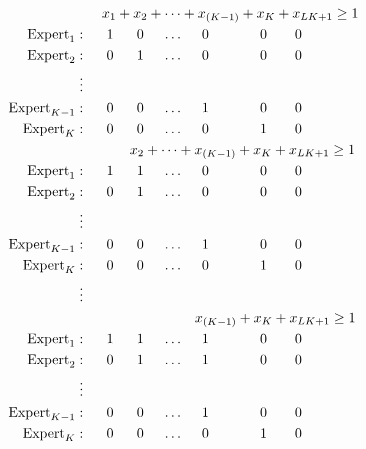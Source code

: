\begin{align*}
     & \ \ \ \ x_{1} + x_{2} + \dots + x_{(K-1)} + x_{K} + x_{LK+1} \ge 1\\
\textnormal{Expert}_{1}: & \ \ \ \ \ 1 \ \ \ \ \ 0 \ \ \ \ \dots \ \ \ \ 0  \ \ \ \ \ \ \ \ \ \ \ 0 \ \ \ \ \ \ 0 \\
\textnormal{Expert}_{2}: & \ \ \ \ \ 0 \ \ \ \ \ 1 \ \ \ \ \dots \ \ \ \ 0  \ \ \ \ \ \ \ \ \ \ \ 0 \ \ \ \ \ \ 0 \\
     \vdots  & \\
\textnormal{Expert}_{K-1}: & \ \ \ \ \ 0 \ \ \ \ \ 0 \ \ \ \ \dots \ \ \ \ 1  \ \ \ \ \ \ \ \ \ \ \ 0 \ \ \ \ \ \ 0 \\
\textnormal{Expert}_{K}: & \ \ \ \ \ 0 \ \ \ \ \ 0 \ \ \ \ \dots \ \ \ \ 0  \ \ \ \ \ \ \ \ \ \ \ 1 \ \ \ \ \ \ 0 \\
     & \ \ \ \ \ \ \ \ \ \ x_{2} + \dots + x_{(K-1)} + x_{K} + x_{LK+1} \ge 1\\
\textnormal{Expert}_{1}: & \ \ \ \ \ 1 \ \ \ \ \ 1 \ \ \ \ \dots \ \ \ \ 0  \ \ \ \ \ \ \ \ \ \ \ 0 \ \ \ \ \ \ 0 \\
\textnormal{Expert}_{2}: & \ \ \ \ \ 0 \ \ \ \ \ 1 \ \ \ \ \dots \ \ \ \ 0  \ \ \ \ \ \ \ \ \ \ \ 0 \ \ \ \ \ \ 0 \\
     \vdots  & \\
\textnormal{Expert}_{K-1}: & \ \ \ \ \ 0 \ \ \ \ \ 0 \ \ \ \ \dots \ \ \ \ 1  \ \ \ \ \ \ \ \ \ \ \ 0 \ \ \ \ \ \ 0 \\
\textnormal{Expert}_{K}: & \ \ \ \ \ 0 \ \ \ \ \ 0 \ \ \ \ \dots \ \ \ \ 0  \ \ \ \ \ \ \ \ \ \ \ 1 \ \ \ \ \ \ 0 \\
     \vdots  & \\
     & \ \ \ \ \ \ \ \ \ \ \ \ \ \ \ \ \ \ \ \ \ \ \ \ x_{(K-1)} + x_{K} + x_{LK+1} \ge 1\\
\textnormal{Expert}_{1}: & \ \ \ \ \ 1 \ \ \ \ \ 1 \ \ \ \ \dots \ \ \ \ 1  \ \ \ \ \ \ \ \ \ \ \ 0 \ \ \ \ \ \ 0 \\
\textnormal{Expert}_{2}: & \ \ \ \ \ 0 \ \ \ \ \ 1 \ \ \ \ \dots \ \ \ \ 1  \ \ \ \ \ \ \ \ \ \ \ 0 \ \ \ \ \ \ 0 \\
     \vdots  & \\
\textnormal{Expert}_{K-1}: & \ \ \ \ \ 0 \ \ \ \ \ 0 \ \ \ \ \dots \ \ \ \ 1  \ \ \ \ \ \ \ \ \ \ \ 0 \ \ \ \ \ \ 0 \\
\textnormal{Expert}_{K}: & \ \ \ \ \ 0 \ \ \ \ \ 0 \ \ \ \ \dots \ \ \ \ 0  \ \ \ \ \ \ \ \ \ \ \ 1 \ \ \ \ \ \ 0 \\
\end{align*}

